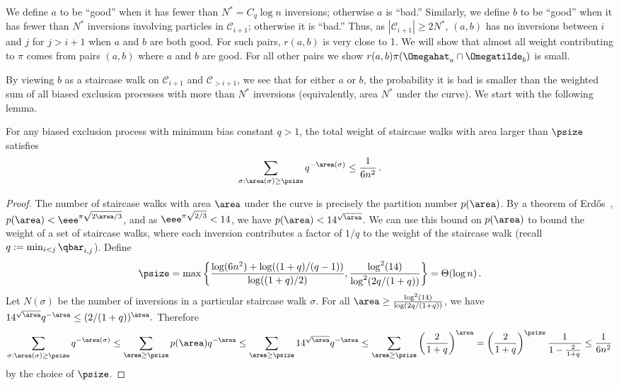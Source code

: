 \documentclass{toc}
\begin{document}
We define $a$ to be ``good'' when it has fewer than $N^*=C_q\log n$ 
inversions; otherwise $a$ is ``bad.''  Similarly, we define $b$ to be 
``good'' when it has fewer than $N^*$ inversions involving particles in 
$\mathcal{C}_{i+1}$; otherwise it is ``bad.''  Thus, as 
$|\mathcal{C}_{i+1}| \geq 2N^*$, $(a,b)$ has no inversions between $i$ 
and $j$ for $j>i+1$ when $a$ and $b$ are both good.  For such pairs, 
$r(a,b)$ is very close to 1.  We will show that almost all weight 
contributing to $\pi$ comes from pairs $(a,b)$ where $a$ and $b$ 
are good.  For all other pairs we show 
$r(a,b)\pi(\Omegahat_a\cap\Omegatilde_{b})$ is small.  

By viewing $b$ 
as a staircase walk on $\mathcal{C}_{i+1}$ and $\mathcal{C}_{> i+1}$, 
we see that for either $a$ or $b$, the 
probability it is bad is smaller than the weighted sum of all biased 
exclusion processes with more than $N^*$ inversions (equivalently, area 
$N^*$ under the curve).  We start with the following lemma.

\begin{lemma}\label{lem:partitions}
For any biased exclusion process with minimum bias constant $q > 1$, 
the total weight of staircase walks with area larger than $\psize$ satisfies 
\[\sum_{\sigma:\area(\sigma)\geq \psize}q^{-\area(\sigma)} \leq \frac{1}{6n^2}\,.\]
\end{lemma}

\begin{proof}


The number of staircase walks with area $\area$ under the curve is 
precisely the partition number $p(\area)$.  By a theorem of 
Erd\H{o}s~\cite{Erdos42}, $p(\area) < \eee^{\pi\sqrt{2\area/3}}$,
and as $\eee^{\pi\sqrt{2/3}}<14$, we have $p(\area) < 14^{\sqrt{\area}}$.
We can use this bound on $p(\area)$ to bound 
the weight of a set of staircase walks, where each inversion 
contributes a factor of $1/q$ to the weight of the staircase walk 
(recall $q:=\min_{i<j} \qbar_{i,j}$).  
Define 
\[\psize = \max\left\{\frac{\log (6n^2)+\log((1+q)/(q-1))}{\log((1+q)/2)}, \frac{\log^2(14)}{\log^2(2q/(1+q))}\right\} = \Theta(\log n)\,.\]
  Let $N(\sigma)$ be the number of inversions in a particular staircase walk $\sigma$.  
  For all $\area\geq
  \frac{\log^2(14)}{\log(2q/(1+q))}$, we have $14^{\sqrt{\area}}q^{-\area}\leq (2/(1+q))^\area.$
  Therefore 
\[  \sum_{\sigma:\area(\sigma)\geq \psize}q^{-\area(\sigma)}\leq \sum_{\area\geq
    \psize}p(\area)q^{-\area} \leq \sum_{\area\geq \psize}14^{\sqrt{\area}}q^{-\area}
%
  \leq \sum_{\area\geq \psize}\left(\frac{2}{1+q}\right)^{\area}  %
     =\left(\frac{2}{1+q}\right)^{\psize}\frac{1}{1-\frac{2}{1+q}}
       \leq \frac{1}{6n^2}\]
by the choice of $\psize$.        
\end{proof}
\end{document}
